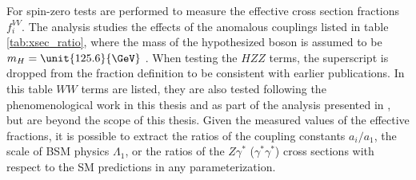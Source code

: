 For spin-zero tests are performed to measure the effective cross section fractions $f_{i}^{VV}$. The analysis studies the effects of the anomalous couplings listed in table \ref{tab:xsec_ratio}, where the mass of the hypothesized boson is assumed to be $m_{H} = \unit{125.6}{\GeV}$ \cite{Chatrchyan:2013mxa}. When testing the $HZZ$ terms, the superscript is dropped from the fraction definition to be consistent with earlier publications. In this table $WW$ terms are listed, they are also tested following the phenomenological work in this thesis and as part of the analysis presented in \cite{Khachatryan:2014kca}, but are beyond the scope of this thesis. Given the measured values of the effective fractions, it is possible to extract the ratios of the coupling constants $a_i/a_1$, the scale of BSM physics $\Lambda_{1}$, or the ratios of the $Z\gamma^*$ ($\gamma^*\gamma^*$) cross sections with respect to the SM predictions in any parameterization.


